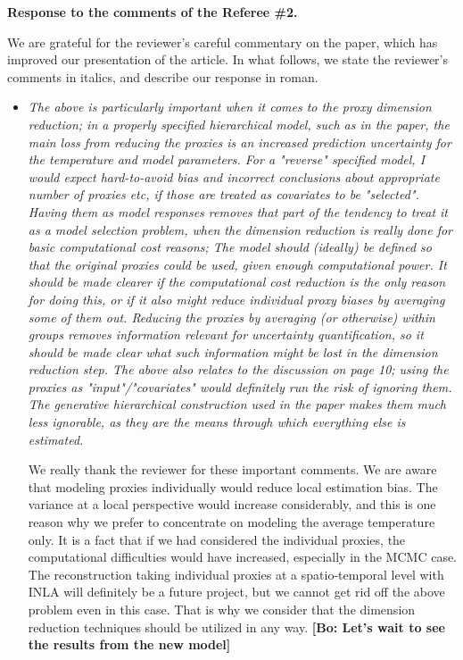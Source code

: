 \documentclass[11pt]{article}
\newcommand{\bl}[1]{\color{red}\textbf{[Bo: #1]}\normalcolor}
\begin{document}
\begin{center}
  {\Large \textbf{Response to the comments of the Referee \#2.}}
\end{center}

We are grateful for the reviewer's careful commentary on the paper, which has improved
our presentation of the article. In what follows, we state the reviewer's
comments in italics, and describe our response in roman.

\begin{itemize}
\item \textit{The above is particularly important when it comes to the proxy
  dimension reduction; in a properly specified hierarchical model,
  such as in the paper, the main loss from reducing the proxies is an
  increased prediction uncertainty for the temperature and model
  parameters.  For a "reverse" specified model, I would expect
  hard-to-avoid bias and incorrect conclusions about appropriate
  number of proxies etc, if those are treated as covariates to be
  "selected". Having them as model responses removes that part of the
  tendency to treat it as a model selection problem, when the
  dimension reduction is really done for basic computational cost
  reasons; The model should (ideally) be defined so that the original
  proxies could be used, given enough computational power.  It should
  be made clearer if the computational cost reduction is the only
  reason for doing this, or if it also might reduce individual proxy
  biases by averaging some of them out.  Reducing the proxies by
  averaging (or otherwise) within groups removes information relevant
  for uncertainty quantification, so it should be made clear what such
  information might be lost in the dimension reduction step. The above also relates to the discussion on page 10; using the
  proxies as "input"/"covariates" would definitely run the risk of
  ignoring them. The generative hierarchical construction used in the
  paper makes them much less ignorable, as they are the means through
  which everything else is estimated.}

We really thank the reviewer for these important comments. We are aware that
modeling proxies individually would reduce local estimation bias. The variance
at a local perspective would increase considerably, and this is one reason why
we prefer to concentrate on modeling the average temperature only. It is a fact
that if we had considered the individual proxies, the computational difficulties
would have increased, especially in the MCMC case. The reconstruction taking
individual proxies at a spatio-temporal level with INLA will definitely be a
future project, but we cannot get rid off the above problem even in this case.
That is why we consider that the dimension reduction techniques should be
utilized in any way.
\bl{Let's wait to see the results from the new model}


\end{itemize}
\end{document}
